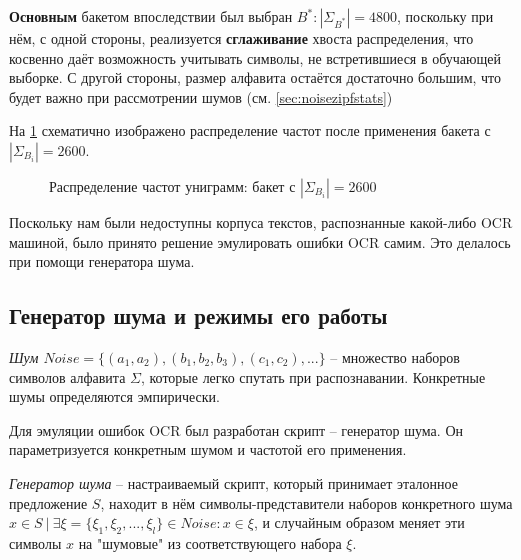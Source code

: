 \textbf{Основным} бакетом впоследствии был выбран $B^* : |\Sigma_{B^*}| = 4800$, поскольку при нём, с одной стороны, реализуется \textbf{сглаживание} хвоста распределения, что косвенно даёт возможность учитывать символы, не встретившиеся в обучающей выборке. С другой стороны, размер алфавита остаётся достаточно большим, что будет важно при рассмотрении шумов (см. \cref{sec:noisezipfstats})

На \cref{fig:bucket_pic} схематично изображено распределение частот после применения бакета с $|\Sigma_{B_i}| = 2600$.

\begin{figure}[H]
	\caption{Распределение частот униграмм: бакет с $|\Sigma_{B_i}| = 2600$}
	\label{fig:bucket_pic}
\end{figure}

Поскольку нам были недоступны корпуса текстов, распознанные какой-либо OCR машиной, было принято решение эмулировать ошибки OCR самим. Это делалось при помощи генератора шума.

\subsection{ Генератор шума и режимы его работы }

\begin{definition}
	{\textit{Шум $Noise = \{ (a_1, a_2), (b_1, b_2, b_3), (c_1, c_2), ... \}$}} -- множество наборов символов алфавита $\Sigma$, которые легко спутать при распознавании. Конкретные шумы определяются эмпирически. 
\end{definition}

Для эмуляции ошибок OCR был разработан скрипт -- генератор шума. Он параметризуется конкретным шумом и частотой его применения.

\begin{definition}
	{\textit{Генератор шума}} -- настраиваемый скрипт, который принимает эталонное предложение $S$, находит в нём символы-представители наборов конкретного шума $x \in S\ |\ \exists \xi = \{ \xi_1, \xi_2, ..., \xi_l \} \in Noise : x \in \xi$, и случайным образом меняет эти символы $x$ на "шумовые" из соответствующего набора $\xi$.
\end{definition}

